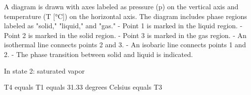 A diagram is drawn with axes labeled as pressure (p) on the vertical axis and temperature (T [°C]) on the horizontal axis. The diagram includes phase regions labeled as "solid," "liquid," and "gas."  
- Point 1 is marked in the liquid region.  
- Point 2 is marked in the solid region.  
- Point 3 is marked in the gas region.  
- An isothermal line connects points 2 and 3.  
- An isobaric line connects points 1 and 2.  
- The phase transition between solid and liquid is indicated.

In state 2: saturated vapor  

T4 equals T1 equals 31.33 degrees Celsius equals T3